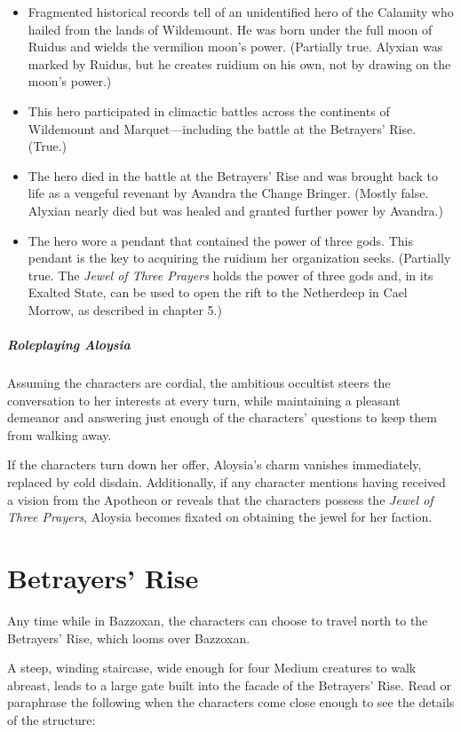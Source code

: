 \documentclass[10pt,a4paper,twoside,bg=print,twocolumn,openany,nodeprecatedcode]{dndbook}
\begin{document}
\begin{itemize}
\item Fragmented historical records tell of an unidentified hero of the Calamity who hailed from the lands of Wildemount. He was born under the full moon of Ruidus and wields the vermilion moon's power. (Partially true. Alyxian was marked by Ruidus, but he creates ruidium on his own, not by drawing on the moon's power.)
\item This hero participated in climactic battles across the continents of Wildemount and Marquet—including the battle at the Betrayers' Rise. (True.)
\item The hero died in the battle at the Betrayers' Rise and was brought back to life as a vengeful revenant by Avandra the Change Bringer. (Mostly false. Alyxian nearly died but was healed and granted further power by Avandra.)
\item The hero wore a pendant that contained the power of three gods. This pendant is the key to acquiring the ruidium her organization seeks. (Partially true. The \textit{Jewel of Three Prayers} holds the power of three gods and, in its Exalted State, can be used to open the rift to the Netherdeep in Cael Morrow, as described in chapter 5.)
\end{itemize}

\subparagraph{Roleplaying Aloysia}
Assuming the characters are cordial, the ambitious occultist steers the conversation to her interests at every turn, while maintaining a pleasant demeanor and answering just enough of the characters' questions to keep them from walking away.

If the characters turn down her offer, Aloysia's charm vanishes immediately, replaced by cold disdain. Additionally, if any character mentions having received a vision from the Apotheon or reveals that the characters possess the \textit{Jewel of Three Prayers}, Aloysia becomes fixated on obtaining the jewel for her faction.

\section{Betrayers' Rise}
Any time while in Bazzoxan, the characters can choose to travel north to the Betrayers' Rise, which looms over Bazzoxan.

A steep, winding staircase, wide enough for four Medium creatures to walk abreast, leads to a large gate built into the facade of the Betrayers' Rise. Read or paraphrase the following when the characters come close enough to see the details of the structure:
\end{document}
